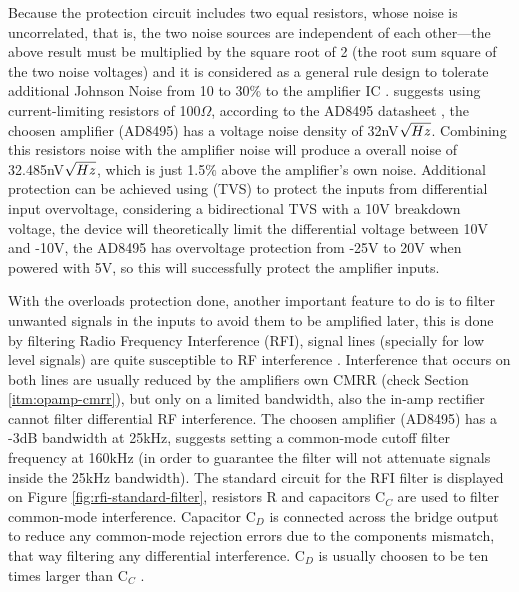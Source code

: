 	Because the protection circuit includes two equal resistors, whose noise is uncorrelated, that is, the two noise sources are independent of each other—the above result must be multiplied by the square root of 2 (the root sum square of the two noise voltages) and it is considered as a general rule design to tolerate additional Johnson Noise from 10 to 30$\%$ to the amplifier IC \cite{sensors2000}. \cite{two-ways-thermocouple} suggests using current-limiting resistors of 100$\Omega$, according to the AD8495 datasheet \cite{ad8495-datasheet}, the choosen amplifier (AD8495) has a voltage noise density of 32nV$\/ \sqrt{Hz}$. Combining this resistors noise with the amplifier noise will produce a overall noise of 32.485nV$\/\sqrt{Hz}$, which is just 1.5$\%$ above the amplifier's own noise. Additional protection can be achieved using (TVS) to protect the inputs from differential input overvoltage, considering a bidirectional TVS with a 10V breakdown voltage, the device will theoretically limit the differential voltage between 10V and -10V, the AD8495 has overvoltage protection from -25V to 20V when powered with 5V, so this will successfully protect the amplifier inputs. 
	\par
	With the overloads protection done, another important feature to do is to filter unwanted signals in the inputs to avoid them to be amplified later, this is done by filtering Radio Frequency Interference (RFI), signal lines (specially for low level signals) are quite susceptible to RF interference \cite{analogDevDesignersGuide}. Interference that occurs on both lines are usually reduced by the amplifiers own CMRR (check Section \ref{itm:opamp-cmrr}), but only on a limited bandwidth, also the in-amp rectifier cannot filter differential RF interference. The choosen amplifier (AD8495) has a -3dB bandwidth at 25kHz, \cite{two-ways-thermocouple} suggests setting a common-mode cutoff filter frequency at 160kHz (in order to guarantee the filter will not attenuate signals inside the 25kHz bandwidth). The standard circuit for the RFI filter is displayed on Figure \ref{fig:rfi-standard-filter}, resistors R and capacitors C$_{C}$ are used to filter common-mode interference. Capacitor C$_{D}$ is connected across the bridge output to reduce any common-mode rejection errors due to the components mismatch, that way filtering any differential interference. C$_{D}$ is usually choosen to be ten times larger than C$_{C}$ \cite{ad8495-datasheet}.
	
